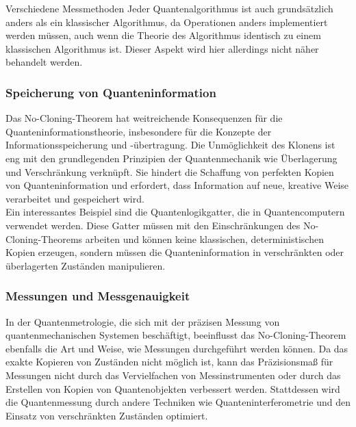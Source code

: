 \begin{tcolorbox}[title=Kommentar,
    title filled=false,
    colback=cyan!5!white,
    colframe=cyan!75!black]
Verschiedene Messmethoden
Jeder Quantenalgorithmus ist auch grundsätzlich anders als ein klassischer Algorithmus, da Operationen anders implementiert
werden müssen, auch wenn die Theorie des Algorithmus identisch zu einem klassischen Algorithmus ist.
    Dieser Aspekt wird hier allerdings nicht näher behandelt werden.
\end{tcolorbox}

\subsubsection{Speicherung von Quanteninformation}
Das No-Cloning-Theorem hat weitreichende Konsequenzen für die Quanteninformationstheorie,
insbesondere für die Konzepte der Informationsspeicherung und -übertragung.
Die Unmöglichkeit des Klonens ist eng mit den grundlegenden Prinzipien der Quantenmechanik wie Überlagerung und Verschränkung verknüpft.
Sie hindert die Schaffung von perfekten Kopien von Quanteninformation und erfordert, dass Information auf neue, kreative Weise verarbeitet und gespeichert wird.\\

Ein interessantes Beispiel sind die Quantenlogikgatter, die in Quantencomputern verwendet werden.
Diese Gatter müssen mit den Einschränkungen des No-Cloning-Theorems arbeiten und können keine klassischen,
deterministischen Kopien erzeugen, sondern müssen die Quanteninformation in verschränkten oder überlagerten Zuständen manipulieren.

\subsubsection{Messungen und Messgenauigkeit}

In der Quantenmetrologie, die sich mit der präzisen Messung von quantenmechanischen Systemen beschäftigt,
beeinflusst das No-Cloning-Theorem ebenfalls die Art und Weise, wie Messungen durchgeführt werden können.
Da das exakte Kopieren von Zuständen nicht möglich ist, kann das Präzisionsmaß für Messungen nicht durch das
Vervielfachen von Messinstrumenten oder durch das Erstellen von Kopien von Quantenobjekten verbessert werden.
Stattdessen wird die Quantenmessung durch andere Techniken wie
Quanteninterferometrie und den Einsatz von verschränkten Zuständen optimiert.



